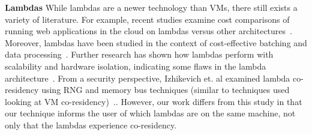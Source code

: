 \textbf{Lambdas}  While lambdas
are a newer technology than VMs, there still exists a variety of literature. For
example, recent studies examine cost comparisons of running web applications in
the cloud on lambdas versus other architectures~\cite{villamizar2016}. Moreover,
lambdas have been studied in the context of cost-effective batching and data
processing~\cite{kiran2015}. Further research has shown how lambdas perform with
scalability and hardware isolation, indicating some flaws in the lambda
architecture~\cite{wangusenix2018}. From a security perspective, Izhikevich et.
al examined lambda co-residency using RNG and memory bus techniques (similar to
techniques used  looking at VM co-residency)~\cite{izhikevich2018}.. However,
our work differs from this study in that our technique informs the user of which
lambdas are on the same machine, not only that the lambdas experience
co-residency.
